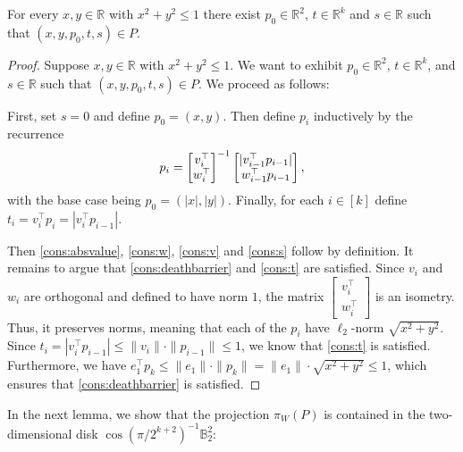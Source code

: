 \documentclass{theoretics}
\newcommand{\R}{\mathbb R}
\newcommand{\T}{\top}
\newcommand{\ball}{\mathbb{B}_2}
\DeclarePairedDelimiter\abs{\lvert}{\rvert}
\begin{document}
\begin{lemma}\label{lem:innerdisk}
For every $x,y \in \R$ with $x^2+y^2 \leq 1$ there exist $p_0 \in \R^2$,
$t \in \R^k$ and $s \in \R$ such that $(x,y,p_0,t,s) \in P$.
\end{lemma}
\begin{proof}
    Suppose $x,y \in \mathbb{R}$ with $x^2 + y^2 \le 1$. We want to exhibit $p_0 \in \mathbb{R}^2$, $t \in \mathbb{R}^k$, and $s \in \mathbb{R}$ such that $(x, y, p_0, t, s)\in P$. We proceed as follows:

    First, set $s = 0$ and define $p_0 = (x,y)$. Then define $p_{i}$ inductively by the recurrence 
    \[
    p_{i} = \begin{bmatrix} v_{i}^\top \\  w_{i}^\top \end{bmatrix}^{-1} \begin{bmatrix}\abs{v_{i-1}^{\top}p_{i-1}}\\ w_{i-1}^{\top}p_{i-1} \end{bmatrix},
    \]
    with the base case being $p_{0} = (|x|, |y|)$. Finally, for each $i \in [k]$ define $t_{i} = v_{i}^{\top} p_{i} = |v_{i}^{\top}p_{i-1}|$.

    Then \eqref{cons:absvalue}, \eqref{cons:w}, \eqref{cons:v} and \eqref{cons:s} follow by definition.  It remains to argue that \eqref{cons:deathbarrier} and \eqref{cons:t} are satisfied. Since $v_{i}$ and $w_{i}$ are orthogonal and defined to have norm $1$, the matrix $\begin{bmatrix} v_{i}^\T \\ w_{i}^\T \end{bmatrix}$ is an isometry. Thus, it preserves norms, meaning that each of the $p_{i}$ have $\ell_2$-norm $\sqrt{x^2 + y^2}$.
    Since $t_i = |v_i^\top p_{i-1}| \leq \|v_i\|\cdot \|p_{i-1}\| \leq 1$,
    we know that \eqref{cons:t} is satisfied.
    Furthermore, we have $e_1^\top p_k \leq \|e_1\|\cdot\|p_k\| = \|e_1\| \cdot \sqrt{x^2 + y^2} \leq 1$,
    which ensures that \eqref{cons:deathbarrier} is satisfied.
\end{proof}

In the next lemma, we show that the projection $\pi_W(P)$ is contained in the two-dimensional disk $\cos(\pi/2^{k+2})^{-1}\ball^2$:
\end{document}
